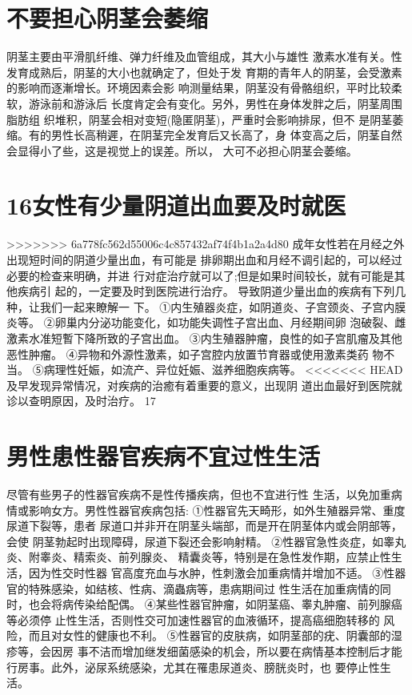 \documentclass[12pt,UTF8]{ctexbook}
\begin{document}
\section{不要担心阴茎会萎缩}
阴茎主要由平滑肌纤维、弹力纤维及血管组成，其大小与雄性
激素水准有关。性发育成熟后，阴茎的大小也就确定了，但处于发
育期的青年人的阴茎，会受激素的影响而逐漸增长。环境因素会影
响测量结果，阴茎没有骨骼组织，平时比较柔软，游泳前和游泳后
长度肯定会有变化。另外，男性在身体发胖之后，阴茎周围脂肪组
织堆积，阴茎会相对变短(隐匿阴茎)，严重时会影响排尿，但不
是阴茎萎缩。有的男性长高稍遲，在阴茎完全发育后又长高了，身
体变高之后，阴茎自然会显得小了些，这是视觉上的误差。所以，
大可不必担心阴茎会萎缩。
\section{16女性有少量阴道出血要及时就医}
>>>>>>> 6a778fc562d55006c4c857432af74f4b1a2a4d80
成年女性若在月经之外出现短时间的阴道少量出血，有可能是
排卵期出血和月经不调引起的，可以经过必要的检查来明确，并进
行对症治疗就可以了;但是如果时间较长，就有可能是其他疾病引
起的，一定要及时到医院进行治疗。
导致阴道少量出血的疾病有下列几种，让我们一起来瞭解一
下。
①内生殖器炎症，如阴道炎、子宫颈炎、子宫内膜炎等。
②卵巢内分泌功能变化，如功能失调性子宫出血、月经期间卵
泡破裂、雌激素水准短暫下降所致的子宫出血。
③内生殖器肿瘤，良性的如子宫肌瘤及其他恶性肿瘤。
④异物和外源性激素，如子宫腔内放置节育器或使用激素类药
物不当。
⑤病理性妊娠，如流产、异位妊娠、滋养细胞疾病等。
<<<<<<< HEAD
及早发现异常情况，对疾病的治癒有着重要的意义，出现阴
道出血最好到医院就诊以查明原因，及时治疗。
17
\section{男性患性器官疾病不宜过性生活}
尽管有些男子的性器官疾病不是性传播疾病，但也不宜进行性
生活，以免加重病情或影响女方。男性性器官疾病包括:
①性器官先天畸形，如外生殖器异常、重度尿道下裂等，患者
尿道口并非开在阴茎头端部，而是开在阴茎体内或会阴部等，会使
阴茎勃起时出现障碍，尿道下裂还会影响射精。
②性器官急性炎症，如睾丸炎、附睾炎、精索炎、前列腺炎、
精囊炎等，特别是在急性发作期，应禁止性生活，因为性交时性器
官高度充血与水肿，性刺激会加重病情并增加不适。
③性器官的特殊感染，如结核、性病、滴蟲病等，患病期间过
性生活在加重病情的同时，也会将病传染给配偶。
④某些性器官肿瘤，如阴茎癌、睾丸肿瘤、前列腺癌等必须停
止性生活，否则性交可加速性器官的血液循环，提高癌细胞转移的
风险，而且对女性的健康也不利。
⑤性器官的皮肤病，如阴茎部的疣、阴囊部的湿疹等，会因房
事不洁而增加继发细菌感染的机会，所以要在病情基本控制后才能
行房事。此外，泌尿系统感染，尤其在罹患尿道炎、膀胱炎时，也
要停止性生活。
\end{document}
